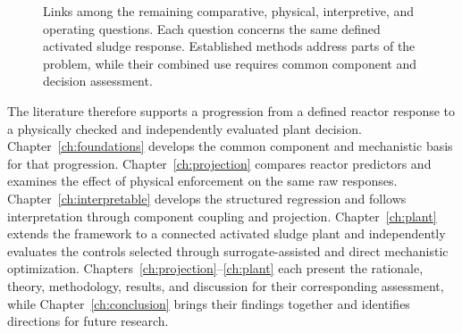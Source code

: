 \begin{figure}[htbp]
\centering
\begingroup\linespread{1}\selectfont

\endgroup
\caption{Links among the remaining comparative, physical, interpretive, and operating questions. Each question concerns the same defined activated sludge response. Established methods address parts of the problem, while their combined use requires common component and decision assessment.}
\label{fig:rrl_intersecting_gaps}
\end{figure}

The literature therefore supports a progression from a defined reactor response to a physically checked and independently evaluated plant decision. Chapter~\ref{ch:foundations} develops the common component and mechanistic basis for that progression. Chapter~\ref{ch:projection} compares reactor predictors and examines the effect of physical enforcement on the same raw responses. Chapter~\ref{ch:interpretable} develops the structured regression and follows interpretation through component coupling and projection. Chapter~\ref{ch:plant} extends the framework to a connected activated sludge plant and independently evaluates the controls selected through surrogate-assisted and direct mechanistic optimization. Chapters~\ref{ch:projection}--\ref{ch:plant} each present the rationale, theory, methodology, results, and discussion for their corresponding assessment, while Chapter~\ref{ch:conclusion} brings their findings together and identifies directions for future research.
